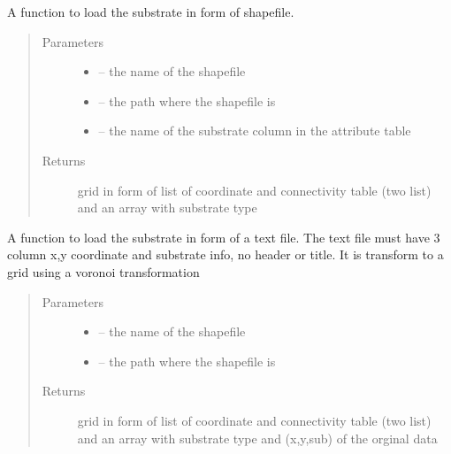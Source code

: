 \documentclass[letterpaper,10pt,english]{sphinxmanual}
\begin{document}
\begin{fulllineitems}
\label{\detokenize{index:src.substrate.load_sub_shp}}
A function to load the substrate in form of shapefile.
\begin{quote}\begin{description}
\item[{Parameters}] \leavevmode\begin{itemize}
\item {} 
 -- the name of the shapefile

\item {} 
 -- the path where the shapefile is

\item {} 
 -- the name of the substrate column in the attribute table

\end{itemize}

\item[{Returns}] \leavevmode
grid in form of list of coordinate and connectivity table (two list)
and an array with substrate type

\end{description}\end{quote}

\end{fulllineitems}


\begin{fulllineitems}
\label{\detokenize{index:src.substrate.load_sub_txt}}
A function to load the substrate in form of a text file. The text file must have 3 column x,y coordinate and
substrate info, no header or title. It is transform to a grid using a voronoi transformation
\begin{quote}\begin{description}
\item[{Parameters}] \leavevmode\begin{itemize}
\item {} 
 -- the name of the shapefile

\item {} 
 -- the path where the shapefile is

\end{itemize}

\item[{Returns}] \leavevmode
grid in form of list of coordinate and connectivity table (two list)
and an array with substrate type and (x,y,sub) of the orginal data

\end{description}\end{quote}

\end{fulllineitems}
\end{document}
